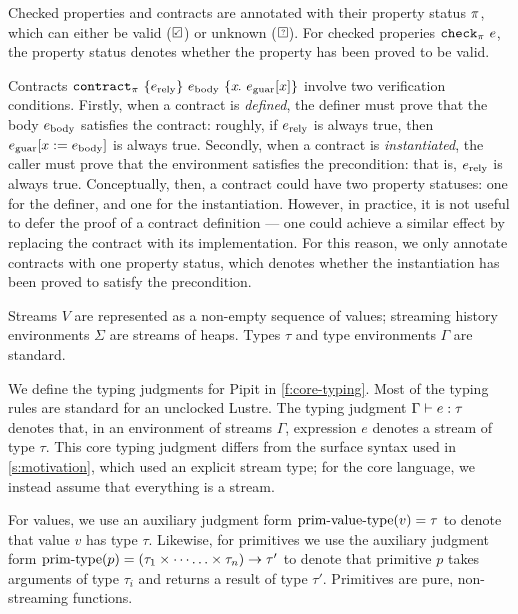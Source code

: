 Checked properties and contracts are annotated with their property status $\pi$, which can either be valid ($\PSValid$) or unknown ($\PSUnknown$).
For checked properies $\texttt{check}_{\pi}~e$, the property status denotes whether the property has been proved to be valid.

Contracts $\texttt{contract}_{\pi}~\{e_{\text{rely}}\}~e_{\text{body}}~\{x\hspace{-0.1em}.~e_{\text{guar}}[x]\}$ involve two verification conditions.
Firstly, when a contract is \emph{defined}, the definer must prove that the body $e_{\text{body}}$ satisfies the contract: roughly, if $e_{\text{rely}}$ is always true, then $e_{\text{guar}}[x := e_{\text{body}}]$ is always true.
Secondly, when a contract is \emph{instantiated}, the caller must prove that the environment satisfies the precondition: that is, $e_{\text{rely}}$ is always true.
Conceptually, then, a contract could have two property statuses: one for the definer, and one for the instantiation.
However, in practice, it is not useful to defer the proof of a contract definition --- one could achieve a similar effect by replacing the contract with its implementation.
For this reason, we only annotate contracts with one property status, which denotes whether the instantiation has been proved to satisfy the precondition.


Streams $V$ are represented as a non-empty sequence of values; streaming history environments $\Sigma$ are streams of heaps.
Types $\tau$ and type environments $\Gamma$ are standard.



We define the typing judgments for Pipit in \autoref{f:core-typing}.
Most of the typing rules are standard for an unclocked Lustre.
The typing judgment $\Gamma \vdash e : \tau$ denotes that, in an environment of streams $\Gamma$, expression $e$ denotes a stream of type $\tau$.
This core typing judgment differs from the surface syntax used in \autoref{s:motivation}, which used an explicit stream type; for the core language, we instead assume that everything is a stream.

For values, we use an auxiliary judgment form $\text{prim-value-type}(v) = \tau$ to denote that value $v$ has type $\tau$.
Likewise, for primitives we use the auxiliary judgment form $\text{prim-type}(p) = (\tau_1 \times \cdots \hdots \times \tau_n) \to \tau'$ to denote that primitive $p$ takes arguments of type $\tau_i$ and returns a result of type $\tau'$.
Primitives are pure, non-streaming functions.

